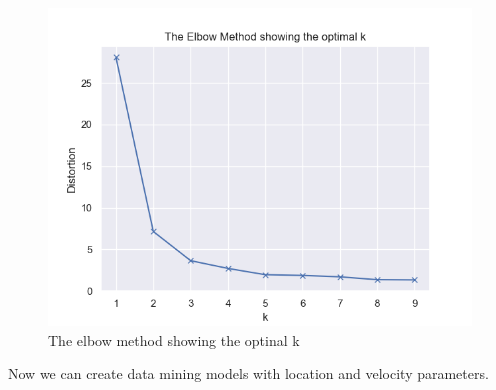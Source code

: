 \begin{figure}[H]
    \centering
    \includegraphics[width=0.8\linewidth]{Chapters/img/elbow_method_server.png}
    \caption{The elbow method showing the optinal k}
    \label{fig:elbow_method_server}
\end{figure}
Now we can create data mining models with location and velocity parameters.


\newpage

